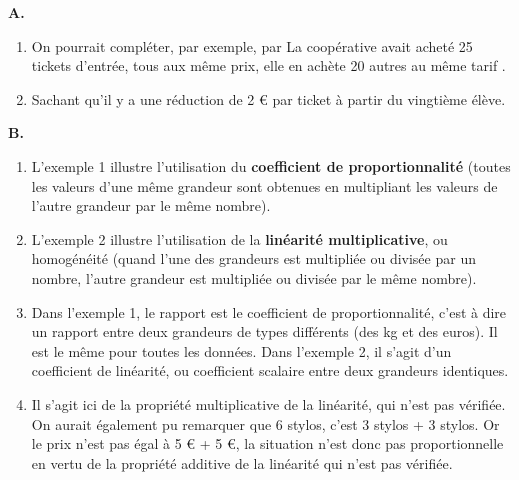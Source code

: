 {\bf A.}
\begin{enumerate}
   \item On pourrait compléter, par exemple, par \og La coopérative avait acheté 25 tickets d'entrée, tous aux même prix, elle en achète 20 autres au même tarif \fg.
   \item \og Sachant qu'il y a une réduction de 2 \euro{} par ticket à partir du vingtième élève. \fg{} \\
\end{enumerate}

{\bf B.}
\begin{enumerate}
   \item L'exemple 1 illustre l'utilisation du {\bf coefficient de proportionnalité} (toutes les valeurs d'une même grandeur sont obtenues en multipliant les valeurs de l'autre grandeur par le même nombre).
   \item L'exemple 2 illustre l'utilisation de la {\bf linéarité multiplicative}, ou homogénéité (quand l'une des grandeurs est multipliée ou divisée par un nombre, l'autre grandeur est multipliée ou divisée par le même nombre).
   \item Dans l'exemple 1, le rapport est le coefficient de proportionnalité, c'est à dire un rapport entre deux grandeurs de types différents (des kg et des euros). Il est le même pour toutes les données. Dans l'exemple 2, il s'agit d'un coefficient de linéarité, ou coefficient scalaire entre deux grandeurs identiques.
   \item Il s'agit ici de la propriété multiplicative de la linéarité, qui n'est pas vérifiée. \\
   On aurait également pu remarquer que 6 stylos, c'est 3 stylos + 3 stylos. Or le prix n'est pas égal à 5 \euro{} + 5 \euro{}, la situation n'est donc pas proportionnelle en vertu de la propriété additive de la linéarité qui n'est pas vérifiée. \\
\end{enumerate}

